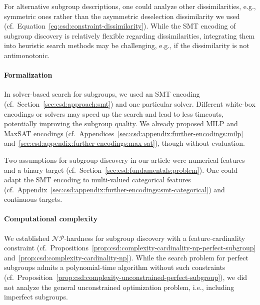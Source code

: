 \documentclass{article}
\theoremstyle{definition}
\begin{document}
For alternative subgroup descriptions, one could analyze other dissimilarities, e.g., symmetric ones rather than the asymmetric deselection dissimilarity we used (cf.~Equation~\ref{eq:csd:constraint-dissimilarity}).
While the SMT encoding of subgroup discovery is relatively flexible regarding dissimilarities, integrating them into heuristic search methods may be challenging, e.g., if the dissimilarity is not antimonotonic.

\paragraph{Formalization}

In solver-based search for subgroups, we used an SMT encoding (cf.~Section~\ref{sec:csd:approach:smt}) and one particular solver.
Different white-box encodings or solvers may speed up the search and lead to less timeouts, potentially improving the subgroup quality.
We already proposed MILP and MaxSAT encodings (cf.~Appendices~\ref{sec:csd:appendix:further-encodings:milp} and~\ref{sec:csd:appendix:further-encodings:max-sat}), though without evaluation.

Two assumptions for subgroup discovery in our article were numerical features and a binary target (cf.~Section~\ref{sec:csd:fundamentals:problem}).
One could adapt the SMT encoding to multi-valued categorical features (cf.~Appendix~\ref{sec:csd:appendix:further-encodings:smt-categorical}) and continuous targets.

\paragraph{Computational complexity}

We established $\mathcal{NP}$-hardness for subgroup discovery with a feature-cardinality constraint (cf.~Propositions~\ref{prop:csd:complexity-cardinality-np-perfect-subgroup} and~\ref{prop:csd:complexity-cardinality-np}).
While the search problem for perfect subgroups admits a polynomial-time algorithm without such constraints (cf.~Proposition~\ref{prop:csd:complexity-unconstrained-perfect-subgroup}), we did not analyze the general unconstrained optimization problem, i.e., including imperfect subgroups.
\end{document}
